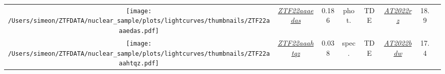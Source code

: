 \begin{table*}
{\begin{tabular}{c c  c  c  c   c  c  c}
      \parbox[c]{12em}{\texttt{[image: /Users/simeon/ZTFDATA/nuclear\_sample/plots/lightcurves/thumbnails/ZTF22aaaedas.pdf]}} & \textit{\href{https://ztfnuclear.simeonreusch.com/transient/ZTF22aaaedas}{ZTF22aaaedas}}          & 0.186          & phot.                   & TDE               &
      \textit{\href{https://www.wis-tns.org/object/2022rz}{AT2022rz}}                                                                             & 18.9                                                                                              &                                                                                                              \\
      \parbox[c]{12em}{\texttt{[image: /Users/simeon/ZTFDATA/nuclear\_sample/plots/lightcurves/thumbnails/ZTF22aaahtqz.pdf]}} & \textit{\href{https://ztfnuclear.simeonreusch.com/transient/ZTF22aaahtqz}{ZTF22aaahtqz}}          & 0.038          & spec.                   & TDE               &
      \textit{\href{https://www.wis-tns.org/object/2022bdw}{AT2022bdw}}                                                                           & 17.4                                                                                              &                                                                                                              \\
    \end{tabular}}
\end{table*}


